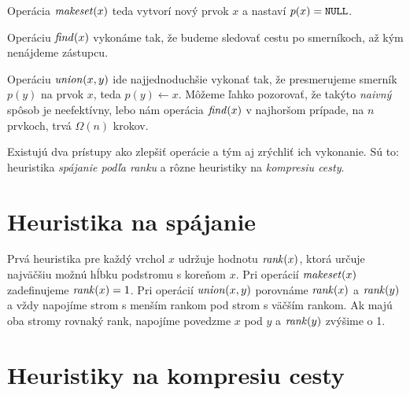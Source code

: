Operácia $\mathop{\mathit{makeset}}(x)$ teda vytvorí nový prvok $x$ a nastaví $p(x) = \texttt{NULL}$. 

Operáciu $\mathop{\mathit{find}}(x)$ vykonáme tak, že budeme sledovať cestu po smerníkoch, až 
kým nenájdeme zástupcu. 

Operáciu $\mathop{\mathit{union}}(x, y)$ ide najjednoduchšie vykonať tak, že presmerujeme smerník 
$p(y)$ na prvok $x$, teda $p(y) \gets x$. 
Môžeme ľahko pozorovať, že takýto \emph{naivný} spôsob je neefektívny, 
lebo nám operácia $\mathop{\mathit{find}}(x)$ v najhoršom prípade, na $n$ prvkoch, trvá $\Omega(n)$ 
krokov. 

\smallskip
Existujú dva prístupy ako zlepšiť operácie a tým aj zrýchliť ich vykonanie. 
Sú to: heuristika \emph{spájanie podľa ranku} a rôzne heuristiky na 
\emph{kompresiu cesty}. 

\section{Heuristika na spájanie}\label{sec:komp-union}

Prvá heuristika pre každý vrchol $x$ udržuje hodnotu $\mathop{\mathit{rank}}(x)$,
ktorá určuje najväčšiu možnú hĺbku podstromu s koreňom $x$.
Pri o\-pe\-rá\-cií $\mathop{\mathit{makeset}}(x)$ zadefinujeme $\mathop{\mathit{rank}}(x) = 1$. 
Pri o\-pe\-rá\-cií $\mathop{\mathit{union}}(x, y)$ porovnáme $\mathop{\mathit{rank}}(x)$ a $\mathop{\mathit{rank}}(y)$
a vždy napojíme strom s menším rankom pod strom s väčším rankom.
Ak majú oba stromy rovnaký rank, napojíme povedzme $x$ pod $y$
a $\mathop{\mathit{rank}}(y)$ zvýšime o 1.

\section{Heuristiky na kompresiu cesty}\label{sec:komp-cesta}
      

